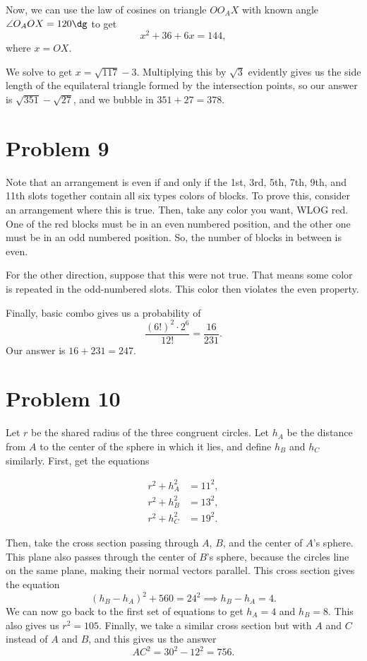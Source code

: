 \documentclass{scrartcl}
\begin{document}
Now, we can use the law of cosines on triangle $OO_AX$ with known angle $\angle O_AOX = 120\dg$
to get
\[ x^2 + 36 + 6x = 144, \]
where $x = OX$.

We solve to get $x = \sqrt{117} - 3$.
Multiplying this by $\sqrt3$ evidently gives us the side length of the
equilateral triangle formed by the intersection points,
so our answer is $\sqrt{351} - \sqrt{27}$, and we bubble in $351 + 27 = \boxed{378}$.

\section*{Problem 9}
Note that an arrangement is even if and only if
the 1st, 3rd, 5th, 7th, 9th, and 11th slots together contain
all six types colors of blocks.
To prove this, consider an arrangement where this is true.
Then, take any color you want, WLOG red.
One of the red blocks must be in an even numbered position,
and the other one must be in an odd numbered position.
So, the number of blocks in between is even.

For the other direction, suppose that this were not true.
That means some color is repeated in the odd-numbered slots.
This color then violates the even property.

Finally, basic combo gives us a probability of
\[ \frac{(6!)^2 \cdot 2^6}{12!} = \frac{16}{231}. \]
Our answer is $16 + 231 = \boxed{247}$.

\section*{Problem 10}
Let $r$ be the shared radius of the three congruent circles.
Let $h_A$ be the distance from $A$ to the center of the sphere in which it lies,
and define $h_B$ and $h_C$ similarly.
First, get the equations

\begin{align*}
r^2 + h_A^2 &= 11^2,\\
r^2 + h_B^2 &= 13^2,\\
r^2 + h_C^2 &= 19^2.
\end{align*}

Then, take the cross section passing through $A$, $B$, and the center of $A$'s sphere.
This plane also passes through the center of $B$'s sphere,
because the circles line on the same plane, making their normal vectors parallel.
This cross section gives the equation
\[ (h_B - h_A)^2 + 560 = 24^2 \implies h_B - h_A = 4. \]
We can now go back to the first set of equations to get $h_A = 4$ and $h_B = 8$.
This also gives us $r^2 = 105$.
Finally, we take a similar cross section but with $A$ and $C$ instead of $A$ and $B$,
and this gives us the answer
\[ AC^2 = 30^2 - 12^2 = \boxed{756}. \]
\end{document}
